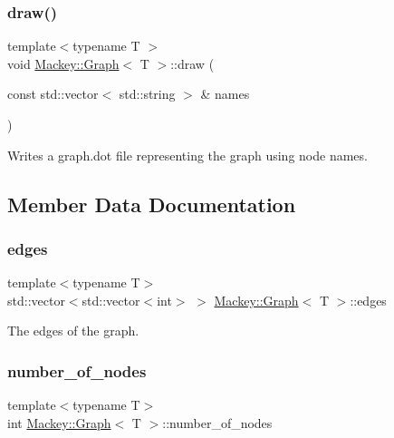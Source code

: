 \subsubsection{\texorpdfstring{draw()}{draw()}\hspace{0.1cm}{\footnotesize\ttfamily [2/2]}}
{\footnotesize\ttfamily template$<$typename T $>$ \\
void \hyperlink{classMackey_1_1Graph}{Mackey\+::\+Graph}$<$ T $>$\+::draw (\begin{DoxyParamCaption}\item[{const std\+::vector$<$ std\+::string $>$ \&}]{names }\end{DoxyParamCaption})}



Writes a graph.\+dot file representing the graph using node names. 



\subsection{Member Data Documentation}
\mbox{\label{classMackey_1_1Graph_a729ec24b9f9e504f4c4e2d3f6e2cab83}} 
\subsubsection{\texorpdfstring{edges}{edges}}
{\footnotesize\ttfamily template$<$typename T$>$ \\
std\+::vector$<$std\+::vector$<$int$>$ $>$ \hyperlink{classMackey_1_1Graph}{Mackey\+::\+Graph}$<$ T $>$\+::edges}



The edges of the graph. 

\mbox{\label{classMackey_1_1Graph_a6b275a20b0571d4b51fbfa3e596cd67a}} 
\subsubsection{\texorpdfstring{number\+\_\+of\+\_\+nodes}{number\_of\_nodes}}
{\footnotesize\ttfamily template$<$typename T$>$ \\
int \hyperlink{classMackey_1_1Graph}{Mackey\+::\+Graph}$<$ T $>$\+::number\+\_\+of\+\_\+nodes}



